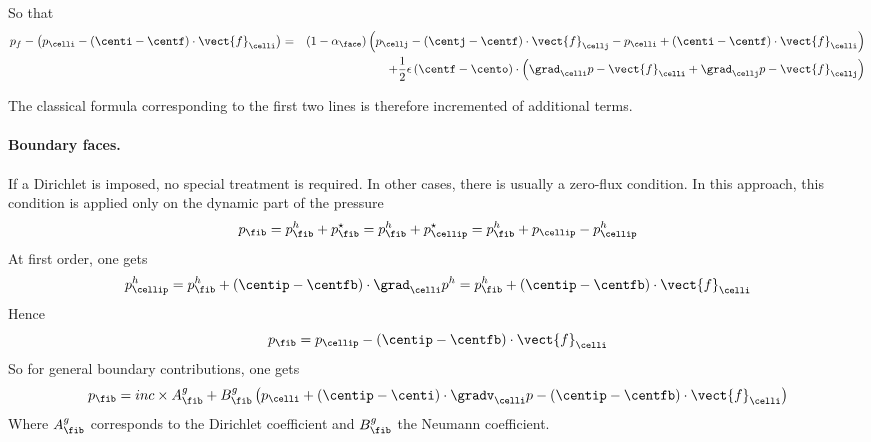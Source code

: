 So that
\begin{align*}
  p_{f}-\left(p_{\celli}-\left(\centi-\centf\right)\cdot\vect{f}_{\celli}\right)&=&\left(1-\alpha_{\face}\right)\left(p_{\cellj}-\left(\centj-\centf\right)\cdot\vect{f}_{\cellj}-p_{\celli}+\left(\centi-\centf\right)\cdot\vect{f}_{\celli}\right) \\ &&+\frac{1}{2}\epsilon\left(\centf-\cento\right)\cdot\left(\grad_{\celli}{p}-\vect{f}_{\celli}+\grad_{\cellj}{p}-\vect{f}_{\cellj}\right)
\end{align*}

The classical formula corresponding to the first two lines is therefore incremented
of additional terms.

\paragraph{Boundary faces.} If a Dirichlet is imposed, no special treatment is
required. In other cases, there is usually a zero-flux condition. In this
approach, this condition is applied only on the dynamic part of the pressure
\begin{equation}
        p_{\fib}=p_{\fib}^{h}+p_{\fib}^\star=p_{\fib}^{h}+p_{\cellip}^\star=p_{\fib}^{h}+p_{\cellip}-p_{\cellip}^{h}
\end{equation}
At first order, one gets
\begin{equation}
        p_{\cellip}^{h}=p_{\fib}^{h}+\left(\centip-\centfb\right)\cdot\grad_{\celli}{p}^{h}=p_{\fib}^{h}+\left(\centip-\centfb\right)\cdot\vect{f}_{\celli}
\end{equation}
Hence
\begin{equation}
        p_{\fib}=p_{\cellip}-\left(\centip-\centfb\right)\cdot\vect{f}_{\celli}
\end{equation}
So for general boundary contributions, one gets
\begin{equation}
  p_{\fib}=inc\times A^{g}_{\fib}+B^{g}_{\fib}\left(p_{\celli}+\left(\centip-\centi\right)\cdot\gradv_{\celli}p-\left(\centip-\centfb\right)\cdot\vect{f}_{\celli}\right)
\end{equation}
Where $A^{g}_{\fib}$ corresponds to the Dirichlet coefficient and $B^{g}_{\fib}$
the Neumann coefficient.

